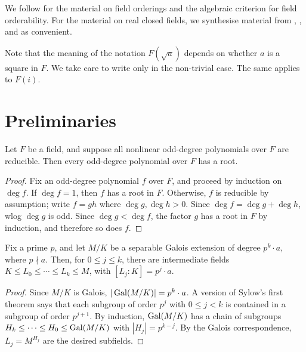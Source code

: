 %

We follow \cite{Lam1984} for the material on field orderings and the algebraic criterion for field orderability. For the material on real closed fields, we synthesise material from \cite{Bochnak1998}, \cite{Knebusch2022}, \cite{Jacobson2012I} and \cite{Jacobson2012II} as convenient. 

Note that the meaning of the notation $F(\sqrt{a})$ depends on whether $a$ is a square in $F$. We take care to write only in the non-trivial case. The same applies to $F(i)$.

\section{Preliminaries}

\begin{lemma}
  \label{lem:odd_deg_red_imp_root}
  Let $F$ be a field, and suppose all nonlinear odd-degree polynomials over $F$ are reducible. Then every odd-degree polynomial over $F$ has a root.
\end{lemma}
\begin{proof}
  Fix an odd-degree polynomial $f$ over $F$, and proceed by induction on $\deg f$. If $\deg f=1$, then $f$ has a root in $F$. Otherwise, $f$ is reducible by assumption; write $f=gh$ where $\deg g,\deg h>0$. Since $\deg f=\deg g+\deg h$, wlog $\deg g$ is odd. Since $\deg g<\deg f$, the factor $g$ has a root in $F$ by induction, and therefore so does $f$.
\end{proof}

\begin{lemma}
  \label{lem:sylow_galois}
  Fix a prime $p$, and let $M/K$ be a separable Galois extension of degree $p^k\cdot a$, where $p\nmid a$. Then, for $0\leq j\leq k$, there are intermediate fields $K\leq L_0\leq\cdots\leq L_k\leq M$, with $[L_j:K]=p^j\cdot a$.
\end{lemma}
\begin{proof}
  Since $M/K$ is Galois, $|\operatorname{Gal}(M/K)|=p^k\cdot a$. A version of Sylow's first theorem says that each subgroup of order $p^j$ with $0\leq j<k$ is contained in a subgroup of order $p^{j+1}$. By induction, $\operatorname{Gal}(M/K)$ has a chain of subgroups $H_k\leq\cdots\leq H_0\leq \operatorname{Gal}(M/K)$ with $|H_j|=p^{k-j}$. By the Galois correspondence, $L_j=M^{H_j}$ are the desired subfields.
\end{proof}

